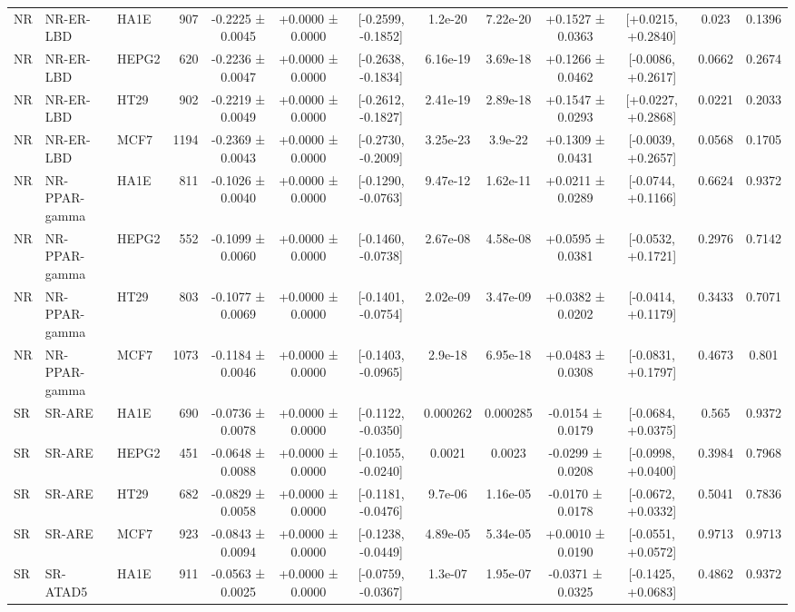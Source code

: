 \begin{landscape}
\begin{longtable}{lll r ccccc cccc}
\addlinespace[1.5pt]
NR & NR-ER-LBD & HA1E & 907 & -0.2225 ± 0.0045 & +0.0000 ± 0.0000 & [-0.2599, -0.1852] & 1.2e-20 & 7.22e-20 & +0.1527 ± 0.0363 & [+0.0215, +0.2840] & 0.023 & 0.1396 \\
NR & NR-ER-LBD & HEPG2 & 620 & -0.2236 ± 0.0047 & +0.0000 ± 0.0000 & [-0.2638, -0.1834] & 6.16e-19 & 3.69e-18 & +0.1266 ± 0.0462 & [-0.0086, +0.2617] & 0.0662 & 0.2674 \\
NR & NR-ER-LBD & HT29 & 902 & -0.2219 ± 0.0049 & +0.0000 ± 0.0000 & [-0.2612, -0.1827] & 2.41e-19 & 2.89e-18 & +0.1547 ± 0.0293 & [+0.0227, +0.2868] & 0.0221 & 0.2033 \\
NR & NR-ER-LBD & MCF7 & 1194 & -0.2369 ± 0.0043 & +0.0000 ± 0.0000 & [-0.2730, -0.2009] & 3.25e-23 & 3.9e-22 & +0.1309 ± 0.0431 & [-0.0039, +0.2657] & 0.0568 & 0.1705 \\
\addlinespace[1.5pt]
NR & NR-PPAR-gamma & HA1E & 811 & -0.1026 ± 0.0040 & +0.0000 ± 0.0000 & [-0.1290, -0.0763] & 9.47e-12 & 1.62e-11 & +0.0211 ± 0.0289 & [-0.0744, +0.1166] & 0.6624 & 0.9372 \\
NR & NR-PPAR-gamma & HEPG2 & 552 & -0.1099 ± 0.0060 & +0.0000 ± 0.0000 & [-0.1460, -0.0738] & 2.67e-08 & 4.58e-08 & +0.0595 ± 0.0381 & [-0.0532, +0.1721] & 0.2976 & 0.7142 \\
NR & NR-PPAR-gamma & HT29 & 803 & -0.1077 ± 0.0069 & +0.0000 ± 0.0000 & [-0.1401, -0.0754] & 2.02e-09 & 3.47e-09 & +0.0382 ± 0.0202 & [-0.0414, +0.1179] & 0.3433 & 0.7071 \\
NR & NR-PPAR-gamma & MCF7 & 1073 & -0.1184 ± 0.0046 & +0.0000 ± 0.0000 & [-0.1403, -0.0965] & 2.9e-18 & 6.95e-18 & +0.0483 ± 0.0308 & [-0.0831, +0.1797] & 0.4673 & 0.801 \\
\midrule\midrule
SR & SR-ARE & HA1E & 690 & -0.0736 ± 0.0078 & +0.0000 ± 0.0000 & [-0.1122, -0.0350] & 0.000262 & 0.000285 & -0.0154 ± 0.0179 & [-0.0684, +0.0375] & 0.565 & 0.9372 \\
SR & SR-ARE & HEPG2 & 451 & -0.0648 ± 0.0088 & +0.0000 ± 0.0000 & [-0.1055, -0.0240] & 0.0021 & 0.0023 & -0.0299 ± 0.0208 & [-0.0998, +0.0400] & 0.3984 & 0.7968 \\
SR & SR-ARE & HT29 & 682 & -0.0829 ± 0.0058 & +0.0000 ± 0.0000 & [-0.1181, -0.0476] & 9.7e-06 & 1.16e-05 & -0.0170 ± 0.0178 & [-0.0672, +0.0332] & 0.5041 & 0.7836 \\
SR & SR-ARE & MCF7 & 923 & -0.0843 ± 0.0094 & +0.0000 ± 0.0000 & [-0.1238, -0.0449] & 4.89e-05 & 5.34e-05 & +0.0010 ± 0.0190 & [-0.0551, +0.0572] & 0.9713 & 0.9713 \\
\addlinespace[1.5pt]
SR & SR-ATAD5 & HA1E & 911 & -0.0563 ± 0.0025 & +0.0000 ± 0.0000 & [-0.0759, -0.0367] & 1.3e-07 & 1.95e-07 & -0.0371 ± 0.0325 & [-0.1425, +0.0683] & 0.4862 & 0.9372 \\

\end{longtable}
\end{landscape}
